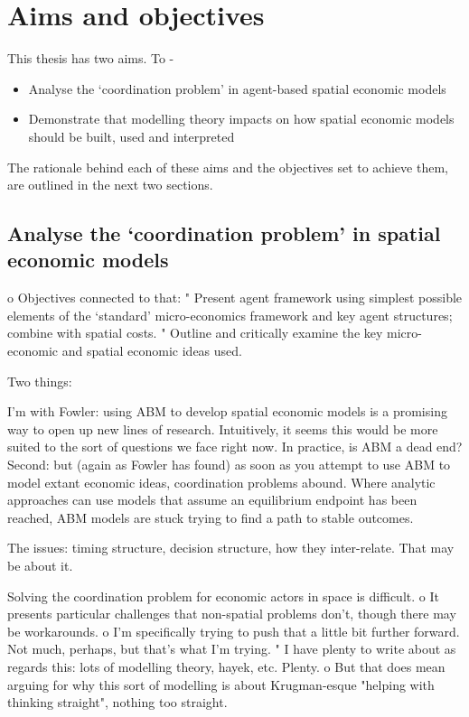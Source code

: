 \section{Aims and objectives \label{sec:aimsobjs}}



This thesis has two aims. To - 

\begin{itemize}
	\item Analyse the `coordination problem' in agent-based spatial economic models
	\item Demonstrate that modelling theory impacts on how spatial economic models should be built, used and interpreted
\end{itemize}

The rationale behind each of these aims and the objectives set to achieve them, are outlined in the next two sections.

\subsection{Analyse the `coordination problem' in spatial economic models \label{sec:aim1}}

o	Objectives connected to that:
"	Present agent framework using simplest possible elements of the `standard' micro-economics framework and key agent structures; combine with spatial costs.
"	Outline and critically examine the key micro-economic and spatial economic ideas used. 

Two things:

I'm with Fowler: using ABM to develop spatial economic models is a promising way to open up new lines of research. Intuitively, it seems this would be more suited to the sort of questions we face right now. In practice, is ABM a dead end? 
Second: but (again as Fowler has found) as soon as you attempt to use ABM to model extant economic ideas, coordination problems abound. Where analytic approaches can use models that assume an equilibrium endpoint has been reached, ABM models are stuck trying to find a path to stable outcomes. 

The issues: timing structure, decision structure, how they inter-relate. That may be about it.

Solving the coordination problem for economic actors in space is difficult.
o	It presents particular challenges that non-spatial problems don't, though there may be workarounds.
o	I'm specifically trying to push that a little bit further forward. Not much, perhaps, but that's what I'm trying. 
"	I have plenty to write about as regards this: lots of modelling theory, hayek, etc. Plenty. 
o	But that does mean arguing for why this sort of modelling is about Krugman-esque "helping with thinking straight", nothing too straight.

